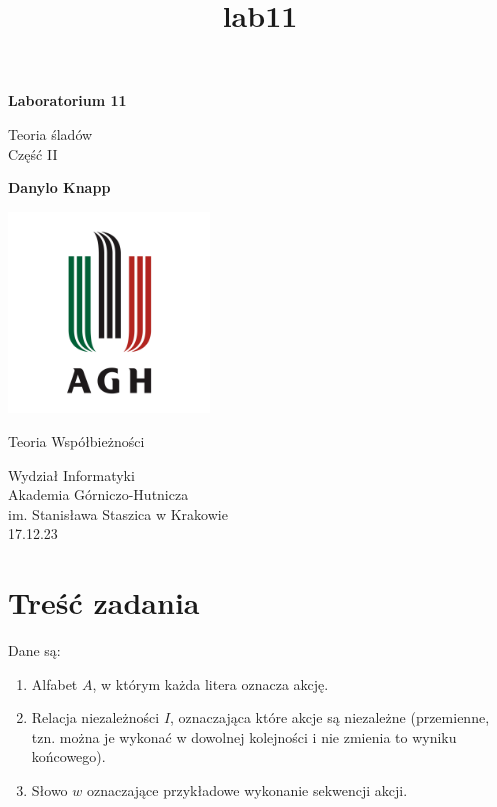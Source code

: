 \documentclass[11pt]{article}
\title{lab11}
\providecommand{\tightlist}{%
      \setlength{\itemsep}{0pt}\setlength{\parskip}{0pt}}
\begin{document}
    
    \begin{titlepage}
        \begin{center}
            \vspace*{1cm}
    
            \textbf{Laboratorium 11}
    
            \vspace{0.5cm}
            Teoria śladów\\
            Część II
                
            \vspace{1.5cm}
    
            \textbf{Danylo Knapp}

            \vfill

            \includegraphics[width=0.4\textwidth]{../report-templates/agh-logo.png}
    
            \vfill
                
            Teoria Współbieżności
                
            \vspace{0.8cm}

            Wydział Informatyki\\
            Akademia Górniczo-Hutnicza\\
            im. Stanisława Staszica w Krakowie\\
            17.12.23
                
        \end{center}
    \end{titlepage}
    
    \hypertarget{treux15bux107-zadania}{%
\section{Treść zadania}\label{treux15bux107-zadania}}

Dane są:

\begin{enumerate}
\def\labelenumi{\arabic{enumi}.}
\tightlist
\item
  Alfabet \(A\), w którym każda litera oznacza akcję.
\item
  Relacja niezależności \(I\), oznaczająca które akcje są niezależne
  (przemienne, tzn. można je wykonać w dowolnej kolejności i nie zmienia
  to wyniku końcowego).
\item
  Słowo \(w\) oznaczające przykładowe wykonanie sekwencji akcji.
\end{enumerate}
\end{document}
